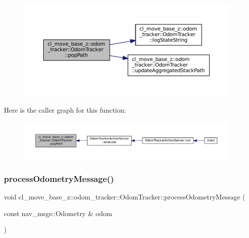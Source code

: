 \begin{figure}[H]
\begin{center}
\leavevmode
\includegraphics[width=350pt]{classcl__move__base__z_1_1odom__tracker_1_1OdomTracker_a2749e5cd0443423d50864a0166b078b9_cgraph}
\end{center}
\end{figure}
Here is the caller graph for this function\+:
\nopagebreak
\begin{figure}[H]
\begin{center}
\leavevmode
\includegraphics[width=350pt]{classcl__move__base__z_1_1odom__tracker_1_1OdomTracker_a2749e5cd0443423d50864a0166b078b9_icgraph}
\end{center}
\end{figure}
\mbox{\label{classcl__move__base__z_1_1odom__tracker_1_1OdomTracker_a12c5a839cfde2e8f2f55a5e0c9647b18}} 
\subsubsection{\texorpdfstring{process\+Odometry\+Message()}{processOdometryMessage()}}
{\footnotesize\ttfamily void cl\+\_\+move\+\_\+base\+\_\+z\+::odom\+\_\+tracker\+::\+Odom\+Tracker\+::process\+Odometry\+Message (\begin{DoxyParamCaption}\item[{const nav\+\_\+msgs\+::\+Odometry \&}]{odom }\end{DoxyParamCaption})\hspace{0.3cm}{\ttfamily [virtual]}}



